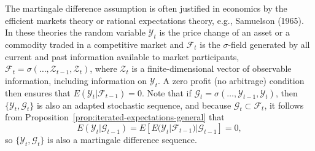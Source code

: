 The martingale difference assumption is often justified in economics by the efficient markets theory or rational expectations theory, e.g., Samuelson (1965). In these theories the random variable $\mathcal{Y}_t$ is the price change of an asset or a commodity traded in a competitive market and $\mathcal{F}_t$ is the $\sigma$-field generated by all current and past information available to market participants, $\mathcal{F}_t = \sigma(\ldots, \mathcal{Z}_{t-1}, \mathcal{Z}_t)$, where $\mathcal{Z}_t$ is a finite-dimensional vector of observable information, including information on $\mathcal{Y}_t$. A zero profit (no arbitrage) condition then ensures that $E(\mathcal{Y}_t | \mathcal{F}_{t-1}) = 0$. Note that if $\mathcal{G}_t = \sigma(\ldots, \mathcal{Y}_{t-1}, \mathcal{Y}_t)$, then $\{\mathcal{Y}_t, \mathcal{G}_t\}$ is also an adapted stochastic sequence, and because $\mathcal{G}_t \subset \mathcal{F}_t$, it follows from Proposition~\ref{prop:iterated-expectations-general} that
\[
E(\mathcal{Y}_t | \mathcal{G}_{t-1}) = E[E(\mathcal{Y}_t | \mathcal{F}_{t-1}) | \mathcal{G}_{t-1}] = 0,
\]
so $\{\mathcal{Y}_t, \mathcal{G}_t\}$ is also a martingale difference sequence.

